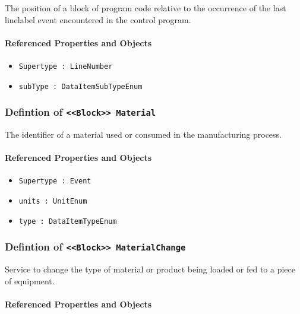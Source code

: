 \FloatBarrier

The position of a block of program code relative to the occurrence of the last linelabel event encountered in the control program.

\FloatBarrier
\paragraph{Referenced Properties and Objects}

\begin{itemize}
\item \texttt{Supertype : LineNumber}

\item \texttt{subType : DataItemSubTypeEnum}

\end{itemize}
\FloatBarrier
\subsubsection{Defintion of \texttt{<<Block>> Material}}
  \label{type:Material}

\FloatBarrier

The identifier of a material used or consumed in the manufacturing process.

\FloatBarrier
\paragraph{Referenced Properties and Objects}

\begin{itemize}
\item \texttt{Supertype : Event}

\item \texttt{units : UnitEnum}

\item \texttt{type : DataItemTypeEnum}

\end{itemize}
\FloatBarrier
\subsubsection{Defintion of \texttt{<<Block>> MaterialChange}}
  \label{type:MaterialChange}

\FloatBarrier

Service to change the type of material or product being loaded or fed to a piece of equipment.

\FloatBarrier
\paragraph{Referenced Properties and Objects}


